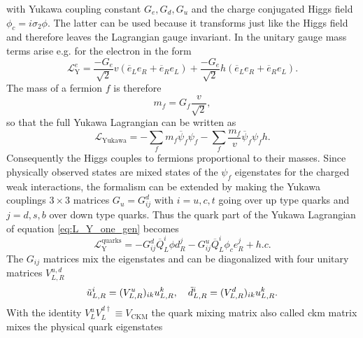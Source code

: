 with Yukawa coupling constant $G_e,G_d,G_u$ and the charge conjugated Higgs field $\phi_c=i\sigma_2\phi$. The latter can be used because it transforms just like the Higgs field and therefore leaves the Lagrangian gauge invariant. In the unitary gauge mass terms arise e.g. for the electron in the form
\begin{equation}
    \mathcal{L}_\mathrm{Y}^e=\frac{-G_e}{\sqrt{2}} v (\overline{e}_L e_R+\overline{e}_R e_L)+\frac{-G_e}{\sqrt{2}} h (\overline{e}_L e_R+\overline{e}_R e_L).
\end{equation}
The mass of a fermion $f$ is therefore
\begin{equation}
    m_f=G_f\frac{v}{\sqrt{2}},
\end{equation}
so that the full Yukawa Lagrangian can be written as
\begin{equation}
    \mathcal{L}_\mathrm{Yukawa}=-\sum_f m_f\overline{\psi}_f \psi_f -\sum_f \frac{m_f}{v}\overline{\psi}_f \psi_f h.
    \label{eq:yukawa_term}
\end{equation}
Consequently the Higgs couples to fermions proportional to their masses. Since physically observed states are mixed states of the $\psi_f$ eigenstates for the charged weak interactions, the formalism can be extended by making the Yukawa couplings $3\times 3$ matrices $G_u=G_{ij}^d$ with $i=u,c,t$ going over up type quarks and $j=d,s,b$ over down type quarks. Thus the quark part of the Yukawa Lagrangian of equation \ref{eq:L_Y_one_gen} becomes
\begin{equation}
    \mathcal{L}_\mathrm{Y}^{\text{quarks}} =
    -G_{ij}^d \overline{Q}_L^i \phi d_R^j -G_{ij}^u \overline{Q}_L^i \phi_c e_R^j + h.c.
\end{equation}
The $G_{ij}$ matrices mix the eigenstates and can be diagonalized with four unitary matrices $V_{L,R}^{u,d}$
\begin{equation}
    \Tilde{u}^i_{L,R}=(V^u_{L,R})_{ik}u^k_{L,R}, \quad \Tilde{d}^i_{L,R}=(V^d_{L,R})_{ik}u^k_{L,R}.
\end{equation}
With the identity $V_L^uV_L^{d\dagger}\equiv V_\mathrm{CKM}$ the quark mixing matrix also called \acf{ckm} matrix mixes the physical quark eigenstates
